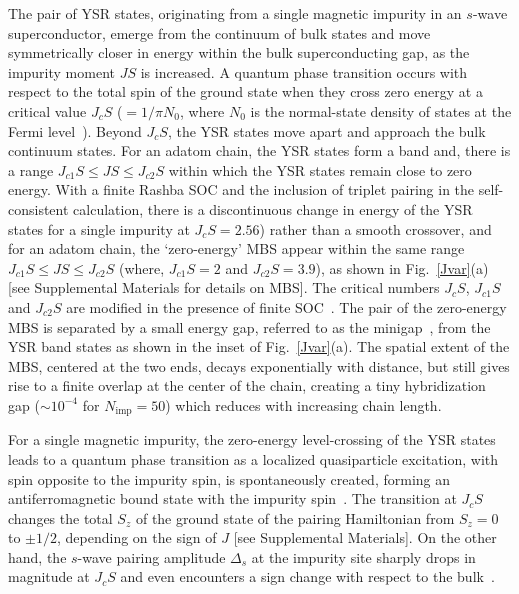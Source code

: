 \documentclass[aps,prl,reprint,nobibnotes]{revtex4-1}
\begin{document}
The pair of YSR states, originating from a single magnetic impurity in an $s$-wave superconductor, emerge from the continuum of bulk states and move symmetrically closer in energy within the bulk superconducting gap, as the impurity moment $JS$ is increased. A quantum phase transition occurs with respect to the total spin of the ground state when they cross zero energy at a critical value $J_cS$ ($=1/\pi N_0$, where $N_0$ is the normal-state density of states at the Fermi level~\cite{RevModPhys.78.373}). Beyond $J_cS$, the YSR states move apart and approach the bulk continuum states. For an adatom chain, the YSR states form a band and, there is a range $J_{c1}S \leq JS \leq J_{c2}S$ within which the YSR states remain close to zero energy. With a finite Rashba SOC and the inclusion of triplet pairing in the self-consistent calculation, there is a discontinuous change in energy of the YSR states for a single impurity at $J_cS=2.56$) rather than a smooth crossover, and for an adatom chain, the `zero-energy' MBS appear within the same range $J_{c1}S \leq JS \leq J_{c2}S$ (where, $J_{c1}S=2$ and $J_{c2}S=3.9$), as shown in Fig.~\ref{Jvar}(a) [see Supplemental Materials for details on MBS]. The critical numbers $J_{c}S$, $J_{c1}S$ and $J_{c2}S$ are modified in the presence of finite SOC~\cite{PhysRevLett.114.236804}. The pair of the zero-energy MBS is separated by a small energy gap, referred to as the minigap~\cite{PhysRevB.86.024504}, from the YSR band states as shown in the inset of Fig.~\ref{Jvar}(a). The spatial extent of the MBS, centered at the two ends, decays exponentially with distance, but still gives rise to a finite overlap at the center of the chain, creating a tiny hybridization gap ($\sim 10^{-4}$ for $N_{\text{imp}}=50$) which reduces with increasing chain length. 

For a single magnetic impurity, the zero-energy level-crossing of the YSR states leads to a quantum phase transition as a localized quasiparticle excitation, with spin opposite to the impurity spin, is spontaneously created, forming an antiferromagnetic bound state with the impurity spin~\cite{SakuraiPTP1970,PhysRevB.55.12648,RevModPhys.78.373,2017arXiv170505378R}. The transition at $J_{c}S$ changes the total $S_z$ of the ground state of the pairing Hamiltonian from $S_z=0$ to $\pm1/2$, depending on the sign of $J$ [see Supplemental Materials]. On the other hand, the $s$-wave pairing amplitude $\Delta_s$ at the impurity site sharply drops in magnitude at $J_cS$ and even encounters a sign change with respect to the bulk~\cite{RevModPhys.78.373,PhysRevB.95.104521}. 
\end{document}
